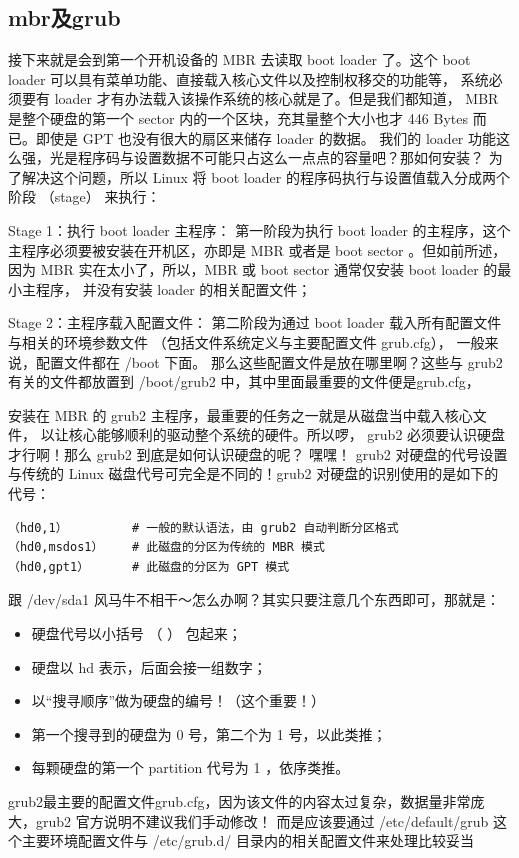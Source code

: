 \subsection{mbr及grub}
接下来就是会到第一个开机设备的 MBR 去读取 boot loader 了。这个 boot loader 可以具有菜单功能、直接载入核心文件以及控制权移交的功能等， 系统必须要有 loader 才有办法载入该操作系统的核心就是了。但是我们都知道， MBR 是整个硬盘的第一个 sector 内的一个区块，充其量整个大小也才 446 Bytes 而已。即使是 GPT 也没有很大的扇区来储存 loader 的数据。 我们的 loader 功能这么强，光是程序码与设置数据不可能只占这么一点点的容量吧？那如何安装？
为了解决这个问题，所以 Linux 将 boot loader 的程序码执行与设置值载入分成两个阶段 （stage） 来执行：

Stage 1：执行 boot loader 主程序： 第一阶段为执行 boot loader 的主程序，这个主程序必须要被安装在开机区，亦即是 MBR 或者是 boot sector 。但如前所述，因为 MBR 实在太小了，所以，MBR 或 boot sector 通常仅安装 boot loader 的最小主程序， 并没有安装 loader 的相关配置文件；

Stage 2：主程序载入配置文件： 第二阶段为通过 boot loader 载入所有配置文件与相关的环境参数文件 （包括文件系统定义与主要配置文件 grub.cfg）， 一般来说，配置文件都在 /boot 下面。
那么这些配置文件是放在哪里啊？这些与 grub2 有关的文件都放置到 /boot/grub2 中，其中里面最重要的文件便是grub.cfg，

安装在 MBR 的 grub2 主程序，最重要的任务之一就是从磁盘当中载入核心文件， 以让核心能够顺利的驱动整个系统的硬件。所以啰， grub2 必须要认识硬盘才行啊！那么 grub2 到底是如何认识硬盘的呢？ 嘿嘿！ grub2 对硬盘的代号设置与传统的 Linux 磁盘代号可完全是不同的！grub2 对硬盘的识别使用的是如下的代号：
\begin{lstlisting}
（hd0,1）         # 一般的默认语法，由 grub2 自动判断分区格式
（hd0,msdos1）    # 此磁盘的分区为传统的 MBR 模式
（hd0,gpt1）      # 此磁盘的分区为 GPT 模式
\end{lstlisting}
跟 /dev/sda1 风马牛不相干～怎么办啊？其实只要注意几个东西即可，那就是：
\begin{itemize}
\item 硬盘代号以小括号 （ ） 包起来；
\item 硬盘以 hd 表示，后面会接一组数字；
\item 以“搜寻顺序”做为硬盘的编号！（这个重要！）
\item 第一个搜寻到的硬盘为 0 号，第二个为 1 号，以此类推；
\item 每颗硬盘的第一个 partition 代号为 1 ，依序类推。
\end{itemize}
grub2最主要的配置文件grub.cfg，因为该文件的内容太过复杂，数据量非常庞大，grub2 官方说明不建议我们手动修改！ 而是应该要通过 /etc/default/grub 这个主要环境配置文件与 /etc/grub.d/ 目录内的相关配置文件来处理比较妥当


